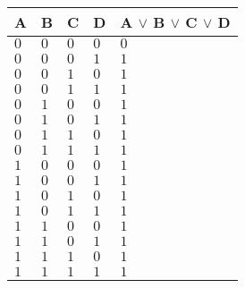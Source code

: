 \documentclass[a4paper]{article}
\begin{document}
\begin{tabu} to 0.9\textwidth { | X[c] | X[c] | X[c] | X[c] | X[c] | }
 \hline
 A & B & C & D & A $\vee$ B $\vee$ C $\vee$ D \\
 \hline
 $0$  & $0$  & $0$  & $0$ & $0$\\
 \hline
 $0$  & $0$  & $0$ & $1$ & $1$ \\
 \hline
 $0$  & $0$  & $1$ & $0$ & $1$\\
 \hline
 $0$  & $0$  & $1$ & $1$ & $1$\\
 \hline
 $0$  & $1$  & $0$  & $0$ & $1$\\
 \hline
 $0$  & $1$  & $0$ & $1$ & $1$\\
 \hline
 $0$  & $1$  & $1$ & $0$ & $1$\\
 \hline
 $0$  & $1$  & $1$ & $1$ & $1$\\
 \hline
 $1$  & $0$  & $0$ & $0$ & $1$\\
 \hline
 $1$  & $0$  & $0$ & $1$ & $1$\\
 \hline
 $1$  & $0$  & $1$ & $0$ & $1$\\
 \hline
 $1$  & $0$  & $1$ & $1$ & $1$\\
 \hline
 $1$  & $1$  & $0$ & $0$ & $1$\\
 \hline
 $1$  & $1$  & $0$ & $1$ & $1$\\
 \hline
 $1$  & $1$  & $1$ & $0$ & $1$\\
 \hline
 $1$  & $1$  & $1$ & $1$ & $1$\\
 
\hline
\end{tabu}
\\
\\
\end{document}
